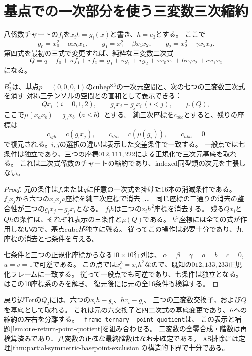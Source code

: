 \section{基点での一次部分を使う三変数三次縮約}
\label{sec:ternary-cubic-reduction}
八係数チャートの$f_i$を$x_i h=g_i(x)$と書き、$h=e_3$とする。
ここで
\[
 g_0=x_0^2-\alpha x_0x_1,\qquad
 g_1=x_1^2-\beta x_1x_2,\qquad
 g_2=x_2^2-\gamma x_2x_0.
\]
第四式を最初の三式で変更すれば、純粋な三変数二次式
\[
 Q=q+f_0+u f_1+v f_2
 =g_0+u g_1+v g_2+a x_0x_1+b x_0x_2+c x_1x_2
\]
になる。

\begin{proposition}[七本の三変数三次条件]\label{prop:ternary-cubic-reduction}
$B_3^*$は、基点$p=(0,0,0,1)$のcube$p^{\otimes3}$の一次元空間と、次の七つの三変数三次式を消す
対称三テンソルの空間との直和として表示できる：
\[
 Qx_i\ (i=0,1,2),\qquad
 g_i x_j-g_j x_i\ (i<j),\qquad
 \mu(Q),
\]
ここで$\mu(x_a x_b)=g_a x_b$（$a\leq b$）とする。
純三次座標を$c_{abc}$とすると、残りの座標は
\[
 c_{ijh}=c(g_i x_j),\qquad c_{ihh}=c(\mu(g_i)),\qquad c_{hhh}=0
\]
で復元される。$i,j$の選択の違いは表示した交差条件で一致する。
一般点では七条件は独立であり、三つの座標$012,111,222$による正規化で三次元基底を取れる。
これは二次式係数のチャートの縮約であり、indexed同型類の次元を主張しない。
\end{proposition}
\begin{proof}
元の条件は$f_i$または$q$に任意の一次式を掛けた16本の消滅条件である。
$f_i x_j$から六つの$x_i x_j h$座標を純三次座標で消去し、
同じ座標の二通りの消去の整合性が三つの$g_i x_j-g_j x_i$となる。
$f_i h$は三つの$x_i h^2$座標を消去する。
残る$Qx_i$と$Qh$の条件は、それぞれ表示の三条件と$\mu(Q)$である。
$h^3$座標には全ての式が作用しないので、基点cubeが独立に残る。
従ってこの操作は必要十分であり、九座標の消去と七条件を与える。

七条件と三つの正規化座標からなる$10\times10$行列は、
$\alpha=\beta=\gamma=a=b=c=0$, $u=v=1$で可逆である。
この点では$x_i^3=x_i h^2$なので、既知の$012,133,233$正規化フレームに一致する。
従って一般点でも可逆であり、七条件は独立となる。
はこの10座標系のみを解き、
復元後には元の全16条件も検算する。
\end{proof}

戻り辺Torの$Q_2$には、六つの$ x_i h-g_i$、$h x_i-g_i$、
三つの三変数交換子、および$Q$を基底として取れる。
これは元の六交換子と四二次式の基底変更であり、$h$への縮約の左右を分離する。
 \texttt{--frame ternary --point-quotient}は、
この表示と補題\ref{lem:one-return-point-quotient}を組み合わせる。
二変数の全零合成・階数は再検算済みであり、八変数の正確な最終階数はなお未確定である。
AS排除には定理\ref{thm:partial-symmetric-basepoint-exclusion}の構造的下界で十分である。
